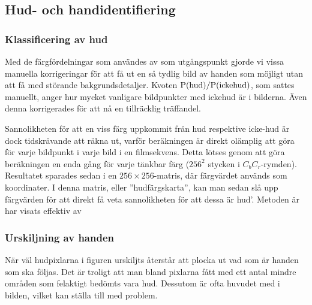 \subsection{Hud- och handidentifiering}

\subsubsection{Klassificering av hud}
Med de färgfördelningar som användes av 
som utgångspunkt gjorde vi vissa manuella korrigeringar för att få ut
en så tydlig bild av handen som möjligt utan att få med störande
bakgrundsdetaljer. Kvoten $\mathrm{P}(\textrm{hud})/\mathrm{P}(\textrm{ickehud})$, som sattes
manuellt, anger hur mycket vanligare bildpunkter med ickehud är i
bilderna. Även denna korrigerades för att nå en tillräcklig träffandel.

Sannolikheten för att en viss färg uppkommit från hud respektive
icke-hud är dock tidskrävande att räkna ut, varför beräkningen
är direkt olämplig att göra för varje bildpunkt i varje bild i en
filmsekvens. Detta lötses genom att göra beräkningen en enda gång för
varje tänkbar färg ($256^2$ stycken i $C_bC_r$-rymden). Resultatet sparades
sedan i en $256\times256$-matris, där färgvärdet används som koordinater.
I denna matris, eller ''hudfärgskarta'', kan man sedan slå upp
färgvärden för att direkt få veta sannolikheten för att dessa är
hud'. Metoden är har visats effektiv av 

\subsubsection{Urskiljning av handen}\label{sec:metod_hud:urskiljning}

När väl hudpixlarna i figuren urskiljts återstår att plocka ut
vad som är handen som ska följas. Det är troligt att man bland
pixlarna fått med ett antal mindre områden som felaktigt bedömts vara
hud. Dessutom är ofta huvudet med i bilden, vilket kan ställa till med
problem. 

